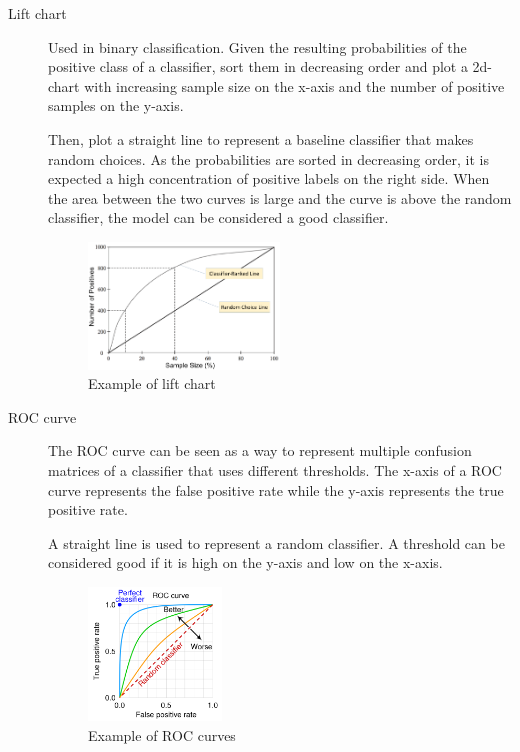 \begin{description}
    \item[Lift chart] 
        Used in binary classification.
        Given the resulting probabilities of the positive class of a classifier, 
        sort them in decreasing order and plot a 2d-chart with
        increasing sample size on the x-axis and the number of positive samples on the y-axis.

        Then, plot a straight line to represent a baseline classifier that makes random choices.
        As the probabilities are sorted in decreasing order, it is expected a high concentration of
        positive labels on the right side.
        When the area between the two curves is large and the curve is above the random classifier, 
        the model can be considered a good classifier.

        \begin{figure}[h]
            \centering
            \includegraphics[width=0.5\textwidth]{img/lift_chart.png}
            \caption{Example of lift chart}
        \end{figure}

    \item[ROC curve] 
        The ROC curve can be seen as a way to represent multiple confusion matrices of a classifier
        that uses different thresholds.
        The x-axis of a ROC curve represents the false positive rate while the y-axis represents the true positive rate.

        A straight line is used to represent a random classifier.
        A threshold can be considered good if it is high on the y-axis and low on the x-axis.
        
        \begin{figure}[h]
            \centering
            \includegraphics[width=0.35\textwidth]{img/roc_curve.png}
            \caption{Example of ROC curves}
        \end{figure}
\end{description}


